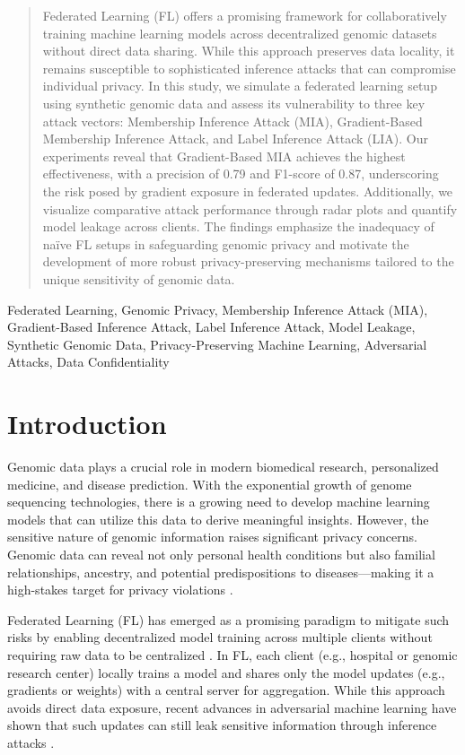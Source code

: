 \documentclass[conference]{IEEEtran}
\begin{document}
\begin{abstract}
Federated Learning (FL) offers a promising framework for collaboratively training machine learning models across decentralized genomic datasets without direct data sharing. While this approach preserves data locality, it remains susceptible to sophisticated inference attacks that can compromise individual privacy. In this study, we simulate a federated learning setup using synthetic genomic data and assess its vulnerability to three key attack vectors: Membership Inference Attack (MIA), Gradient-Based Membership Inference Attack, and Label Inference Attack (LIA). Our experiments reveal that Gradient-Based MIA achieves the highest effectiveness, with a precision of 0.79 and F1-score of 0.87, underscoring the risk posed by gradient exposure in federated updates. Additionally, we visualize comparative attack performance through radar plots and quantify model leakage across clients. The findings emphasize the inadequacy of naïve FL setups in safeguarding genomic privacy and motivate the development of more robust privacy-preserving mechanisms tailored to the unique sensitivity of genomic data.
\end{abstract}
\begin{IEEEkeywords}
 Federated Learning, Genomic Privacy, Membership Inference Attack (MIA), Gradient-Based Inference Attack, Label Inference Attack, Model Leakage, Synthetic Genomic Data, Privacy-Preserving Machine Learning, Adversarial Attacks, Data Confidentiality
\end{IEEEkeywords}

\section{Introduction}
Genomic data plays a crucial role in modern biomedical research, personalized medicine, and disease prediction. With the exponential growth of genome sequencing technologies, there is a growing need to develop machine learning models that can utilize this data to derive meaningful insights. However, the sensitive nature of genomic information raises significant privacy concerns. Genomic data can reveal not only personal health conditions but also familial relationships, ancestry, and potential predispositions to diseases—making it a high-stakes target for privacy violations \cite{liu2023recentadvances1}.

Federated Learning (FL) has emerged as a promising paradigm to mitigate such risks by enabling decentralized model training across multiple clients without requiring raw data to be centralized \cite{liu2023recentadvances1}\cite{chai2024survey2}\cite{mcmahan2023communication3}. In FL, each client (e.g., hospital or genomic research center) locally trains a model and shares only the model updates (e.g., gradients or weights) with a central server for aggregation. While this approach avoids direct data exposure, recent advances in adversarial machine learning have shown that such updates can still leak sensitive information through inference attacks \cite{bai2024membership4}\cite{gbmia2023gradient5}.
\end{document}
